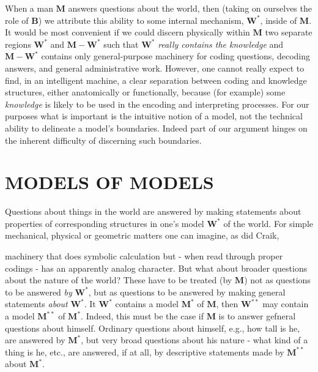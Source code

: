 \documentclass{article}
\begin{document}
When a man $\mathbf{M}$ answers questions about the world, then (taking on ourselves the role of $\mathbf{B}$) we attribute this ability to some internal mechanism, $\mathbf{W^\ast}$, inside of $\mathbf{M}$. It would be most convenient if we could discern physically within $\mathbf{M}$ two separate regions $\mathbf{W^\ast}$ and $\mathbf{M-W^\ast}$ such that $\mathbf{W^\ast}$ \textit{really contains the knowledge} and $\mathbf{M-W^\ast}$ contains only general-purpose machinery for coding questions, decoding answers, and general administrative work. However, one cannot really expect to find, in an intelligent machine, a clear separation between coding and knowledge structures, either anatomically or functionally, because (for example) some \textit{knowledge} is likely to be used in the encoding and interpreting processes. For our purposes what is important is the intuitive notion of a model, not the technical ability to delineate a model's boundaries. Indeed part of our argument hinges on the inherent difficulty of discerning such boundaries.

\section*{MODELS OF MODELS}

Questions about things in the world are answered by making statements about properties of corresponding structures in one's model $\mathbf{W^\ast}$ of the world. For simple mechanical, physical or geometric matters one can imagine, as did Craik\cite{craik}, 

\newpage

machinery that does symbolic calculation but - when read through proper codings - has an apparently analog character. But what about broader questions about the nature of the world? These have to be treated (by $\mathbf{M}$) not as questions to be answered \textit{by} $\mathbf{W^\ast}$, but as questions to be answered by making general statements \textit{about} $\mathbf{W^\ast}$. It $\mathbf{W^\ast}$ contains a model $\mathbf{M^\ast}$ of $\mathbf{M}$, then $\mathbf{W^{\ast\ast}}$ may contain a model $\mathbf{M^{\ast\ast}}$ of $\mathbf{M^\ast}$. Indeed, this must be the case if $\mathbf{M}$ is to answer gefneral questions about himself. Ordinary questions about himself, e.g., how tall is he, are answered by $\mathbf{M^\ast}$, but very broad questions about his nature - what kind of a thing is he, etc., are answered, if at all, by descriptive statements made by $\mathbf{M^{\ast\ast}}$ about $\mathbf{M^\ast}$.
\end{document}
